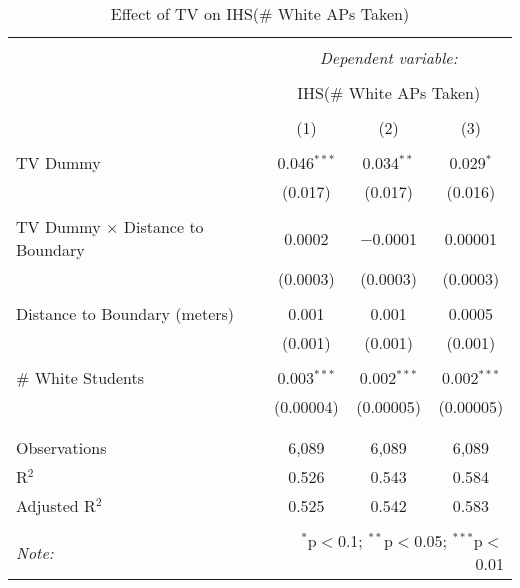 
\begin{table}[!htbp] \centering 
  \caption{Effect of TV on IHS(\# White APs Taken)} 
  \label{} 
\begin{tabular}{@{\extracolsep{-2pt}}lccc} 
\\[-1.8ex]\hline 
\hline \\[-1.8ex] 
 & \multicolumn{3}{c}{\textit{Dependent variable:}} \\ 
\cline{2-4} 
\\[-1.8ex] & \multicolumn{3}{c}{IHS(\# White APs Taken)} \\ 
\\[-1.8ex] & (1) & (2) & (3)\\ 
\hline \\[-1.8ex] 
 TV Dummy & 0.046$^{***}$ & 0.034$^{**}$ & 0.029$^{*}$ \\ 
  & (0.017) & (0.017) & (0.016) \\ 
  & & & \\ 
 TV Dummy $\times$ Distance to Boundary & 0.0002 & $-$0.0001 & 0.00001 \\ 
  & (0.0003) & (0.0003) & (0.0003) \\ 
  & & & \\ 
 Distance to Boundary (meters) & 0.001 & 0.001 & 0.0005 \\ 
  & (0.001) & (0.001) & (0.001) \\ 
  & & & \\ 
 \# White Students & 0.003$^{***}$ & 0.002$^{***}$ & 0.002$^{***}$ \\ 
  & (0.00004) & (0.00005) & (0.00005) \\ 
  & & & \\ 
\hline \\[-1.8ex] 
Observations & 6,089 & 6,089 & 6,089 \\ 
R$^{2}$ & 0.526 & 0.543 & 0.584 \\ 
Adjusted R$^{2}$ & 0.525 & 0.542 & 0.583 \\ 
\hline 
\hline \\[-1.8ex] 
\textit{Note:}  & \multicolumn{3}{r}{$^{*}$p$<$0.1; $^{**}$p$<$0.05; $^{***}$p$<$0.01} \\ 
\end{tabular} 
\end{table} 

